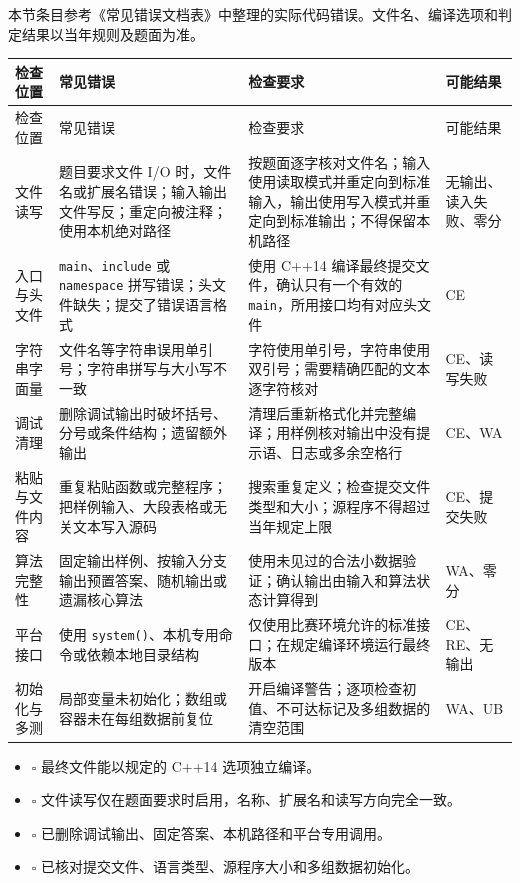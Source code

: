 \documentclass[a4paper,11pt]{article}
\newcommand{\code}[1]{\texttt{#1}}
\begin{document}
本节条目参考《常见错误文档表》中整理的实际代码错误。文件名、编译选项和判定结果以当年规则及题面为准。

\begingroup
\small
\begin{longtable}{L{2.7cm} L{5.4cm} L{6.4cm} L{1.8cm}}
\toprule
检查位置 & 常见错误 & 检查要求 & 可能结果 \\
\midrule
\endfirsthead
\toprule
检查位置 & 常见错误 & 检查要求 & 可能结果 \\
\midrule
\endhead
\endfoot
\bottomrule
\endlastfoot
文件读写 & 题目要求文件 I/O 时，文件名或扩展名错误；输入输出文件写反；重定向被注释；使用本机绝对路径 & 按题面逐字核对文件名；输入使用读取模式并重定向到标准输入，输出使用写入模式并重定向到标准输出；不得保留本机路径 & 无输出、读入失败、零分 \\[1.5mm]
入口与头文件 & \code{main}、\code{include} 或 \code{namespace} 拼写错误；头文件缺失；提交了错误语言格式 & 使用 C++14 编译最终提交文件，确认只有一个有效的 \code{main}，所用接口均有对应头文件 & CE \\[1.5mm]
字符串字面量 & 文件名等字符串误用单引号；字符串拼写与大小写不一致 & 字符使用单引号，字符串使用双引号；需要精确匹配的文本逐字符核对 & CE、读写失败 \\[1.5mm]
调试清理 & 删除调试输出时破坏括号、分号或条件结构；遗留额外输出 & 清理后重新格式化并完整编译；用样例核对输出中没有提示语、日志或多余空格行 & CE、WA \\[1.5mm]
粘贴与文件内容 & 重复粘贴函数或完整程序；把样例输入、大段表格或无关文本写入源码 & 搜索重复定义；检查提交文件类型和大小；源程序不得超过当年规定上限 & CE、提交失败 \\[1.5mm]
算法完整性 & 固定输出样例、按输入分支输出预置答案、随机输出或遗漏核心算法 & 使用未见过的合法小数据验证；确认输出由输入和算法状态计算得到 & WA、零分 \\[1.5mm]
平台接口 & 使用 \code{system()}、本机专用命令或依赖本地目录结构 & 仅使用比赛环境允许的标准接口；在规定编译环境运行最终版本 & CE、RE、无输出 \\[1.5mm]
初始化与多测 & 局部变量未初始化；数组或容器未在每组数据前复位 & 开启编译警告；逐项检查初值、不可达标记及多组数据的清空范围 & WA、UB \\
\end{longtable}
\endgroup

\begin{itemize}
  \item $\square$ 最终文件能以规定的 C++14 选项独立编译。
  \item $\square$ 文件读写仅在题面要求时启用，名称、扩展名和读写方向完全一致。
  \item $\square$ 已删除调试输出、固定答案、本机路径和平台专用调用。
  \item $\square$ 已核对提交文件、语言类型、源程序大小和多组数据初始化。
\end{itemize}
\end{document}
